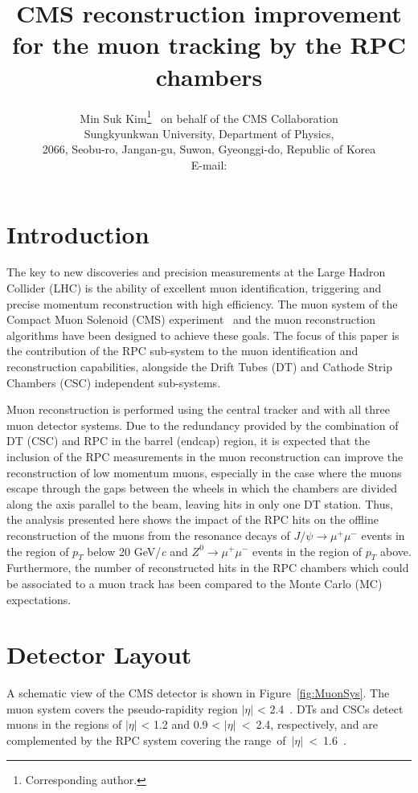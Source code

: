 \documentclass{JINST}
\title{CMS reconstruction improvement for the muon tracking by the RPC chambers}
\author{Min Suk Kim\thanks{Corresponding author.}~ on behalf of the CMS Collaboration\\
\llap{}Sungkyunkwan University, Department of Physics,\\
  2066, Seobu-ro, Jangan-gu, Suwon, Gyeonggi-do, Republic of Korea\\

E-mail: \email{minsuk@cern.ch}

}
\begin{document}
\section{Introduction}

The key to new discoveries and precision measurements at the Large Hadron Collider (LHC) is the ability of excellent muon identification, triggering and precise momentum reconstruction with high efficiency.
The muon system of the Compact Muon Solenoid (CMS) experiment~\cite{CMS_experiment} and the muon reconstruction algorithms have been designed to achieve these goals.
The focus of this paper is the contribution of the RPC sub-system to the muon identification and reconstruction capabilities, alongside the Drift Tubes (DT) and Cathode Strip Chambers (CSC) independent sub-systems.

Muon reconstruction is performed using the central tracker and with all three muon detector systems.
Due to the redundancy provided by the combination of DT (CSC) and RPC in the barrel (endcap) region, 
it is expected that the inclusion of the RPC measurements in the muon reconstruction %
can improve the reconstruction of low momentum muons, especially in the case where the muons escape through the gaps between the wheels in which the chambers are divided along the axis parallel to the beam,
leaving hits in only one DT station.
Thus, the analysis presented here shows the impact of the RPC hits on the offline reconstruction
of the muons from the resonance decays of $J/\psi \rightarrow \mu^+\mu^-$ events in the region of $p_T$ below 20 GeV/\emph{c} and $Z^{0} \rightarrow \mu^+\mu^-$ events in the region of $p_T$ above. %
Furthermore, the number of reconstructed hits in the RPC chambers which could be associated to a muon track has been compared to the Monte Carlo (MC) expectations.

\section{Detector Layout}

A schematic view of the CMS detector is shown in Figure~\ref{fig:MuonSys}.
The muon system covers the pseudo-rapidity region $|\eta|$ < 2.4~\cite{MUO-10-004}. DTs and CSCs detect muons in the regions of $|\eta|$ < 1.2 and 0.9 < $|\eta|$~<~2.4, respectively, and are complemented by the RPC system covering the range~of~$|\eta| $~<~1.6~\cite{RPC_chambers}.
\end{document}
